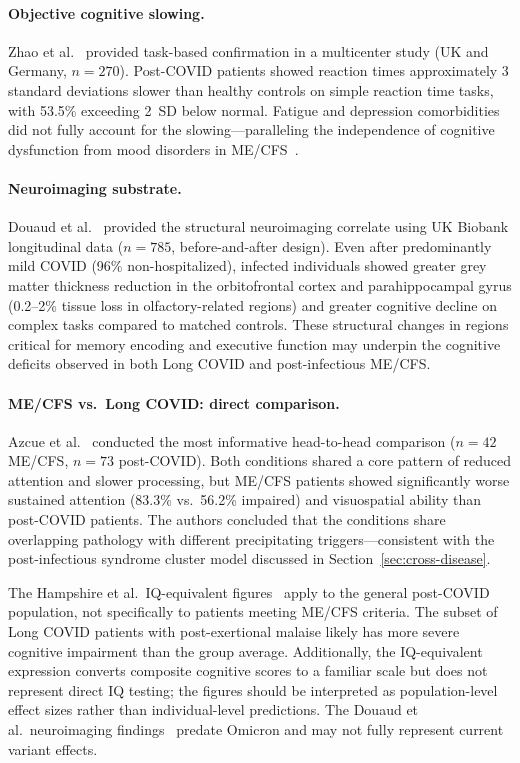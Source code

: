 \paragraph{Objective cognitive slowing.} Zhao et al.~\cite{Zhao2024cognitive} provided task-based confirmation in a multicenter study (UK and Germany, $n = 270$). Post-COVID patients showed reaction times approximately 3 standard deviations slower than healthy controls on simple reaction time tasks, with 53.5\% exceeding 2~SD below normal. Fatigue and depression comorbidities did not fully account for the slowing---paralleling the independence of cognitive dysfunction from mood disorders in ME/CFS~\cite{Sebaiti2022cognitive}.

\paragraph{Neuroimaging substrate.} Douaud et al.~\cite{Douaud2022brain} provided the structural neuroimaging correlate using UK Biobank longitudinal data ($n = 785$, before-and-after design). Even after predominantly mild COVID (96\% non-hospitalized), infected individuals showed greater grey matter thickness reduction in the orbitofrontal cortex and parahippocampal gyrus (0.2--2\% tissue loss in olfactory-related regions) and greater cognitive decline on complex tasks compared to matched controls. These structural changes in regions critical for memory encoding and executive function may underpin the cognitive deficits observed in both Long COVID and post-infectious ME/CFS.

\paragraph{ME/CFS vs.\ Long COVID: direct comparison.} Azcue et al.~\cite{Azcue2022brainfog} conducted the most informative head-to-head comparison ($n = 42$ ME/CFS, $n = 73$ post-COVID). Both conditions shared a core pattern of reduced attention and slower processing, but ME/CFS patients showed significantly worse sustained attention (83.3\% vs.\ 56.2\% impaired) and visuospatial ability than post-COVID patients. The authors concluded that the conditions share overlapping pathology with different precipitating triggers---consistent with the post-infectious syndrome cluster model discussed in Section~\ref{sec:cross-disease}.

\begin{limitation}
The Hampshire et al.\ IQ-equivalent figures~\cite{Hampshire2024cognition} apply to the general post-COVID population, not specifically to patients meeting ME/CFS criteria. The subset of Long COVID patients with post-exertional malaise likely has more severe cognitive impairment than the group average. Additionally, the IQ-equivalent expression converts composite cognitive scores to a familiar scale but does not represent direct IQ testing; the figures should be interpreted as population-level effect sizes rather than individual-level predictions. The Douaud et al.\ neuroimaging findings~\cite{Douaud2022brain} predate Omicron and may not fully represent current variant effects.
\end{limitation}

